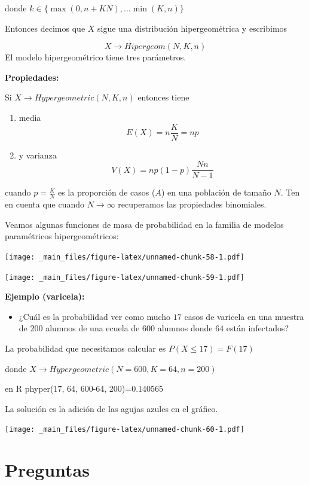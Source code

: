\documentclass[
]{book}
\providecommand{\tightlist}{%
  \setlength{\itemsep}{0pt}\setlength{\parskip}{0pt}}
\begin{document}
donde \(k \in \{\max(0, n+KN), ... \min(K, n) \}\)

Entonces decimos que \(X\) sigue una distribución hipergeométrica y escribimos

\[X \rightarrow Hipergeom(N,K,n)\]
El modelo hipergeométrico tiene tres parámetros.

\textbf{Propiedades:}

Si \(X \rightarrow Hypergeometric(N,K,n)\) entonces tiene

\begin{enumerate}
\def\labelenumi{\arabic{enumi})}
\item
  media \[E(X) = n \frac{K}{N} = np\]
\item
  y varianza \[V(X) = np(1-p)\frac{Nn}{N-1}\]
\end{enumerate}

cuando \(p=\frac{K}{N}\) es la proporción de casos (\(A\)) en una población de tamaño \(N\). Ten en cuenta que cuando \(N \rightarrow \infty\) recuperamos las propiedades binomiales.

Veamos algunas funciones de masa de probabilidad en la familia de modelos paramétricos hipergeométricos:

\texttt{[image: \_main\_files/figure-latex/unnamed-chunk-58-1.pdf]}

\texttt{[image: \_main\_files/figure-latex/unnamed-chunk-59-1.pdf]}

\textbf{Ejemplo (varicela):}

\begin{itemize}
\tightlist
\item
  ¿Cuál es la probabilidad ver como mucho \(17\) casos de varicela en una muestra de \(200\) alumnos de una ecuela de \(600\) alumnos donde \(64\) están infectados?
\end{itemize}

La probabilidad que necesitamos calcular es
\(P(X \leq 17)=F(17)\)

donde \(X \rightarrow Hypergeometric(N=600,K=64,n=200)\)

en R phyper(17, 64, 600-64, 200)=0.140565

La solución es la adición de las agujas azules en el gráfico.

\texttt{[image: \_main\_files/figure-latex/unnamed-chunk-60-1.pdf]}

\hypertarget{preguntas-4}{%
\section{Preguntas}\label{preguntas-4}}
\end{document}
